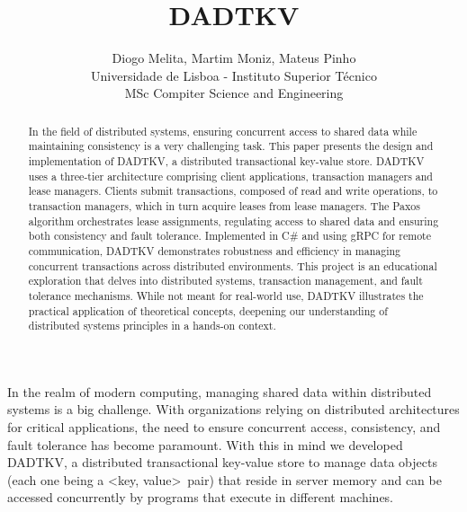 \documentclass[times, 10pt,twocolumn]{article}
\begin{document}
\title{DADTKV}

\author{Diogo Melita, Martim Moniz, Mateus Pinho\\
Universidade de Lisboa - Instituto Superior Técnico\\
MSc Compiter Science and Engineering
}

\maketitle
\thispagestyle{empty}

\begin{abstract}
       In the field of distributed systems, ensuring concurrent access to 
       shared data while maintaining consistency is a very challenging task. This 
       paper presents the design and implementation of DADTKV, a distributed 
       transactional key-value store. DADTKV uses a three-tier architecture 
       comprising client applications, transaction managers and lease managers. 
       Clients submit transactions, composed of read and write operations, to 
       transaction managers, which in turn acquire leases from lease managers. 
       The Paxos algorithm orchestrates lease assignments, regulating access to 
       shared data and ensuring both consistency and fault tolerance. Implemented 
       in C\# and using gRPC for remote communication, DADTKV demonstrates robustness 
       and efficiency in managing concurrent transactions across distributed environments.
       This project is an educational exploration that delves into distributed systems, 
       transaction management, and fault tolerance mechanisms. While not meant for 
       real-world use, DADTKV illustrates the practical application of theoretical 
       concepts, deepening our understanding of distributed systems principles in 
       a hands-on context.
\end{abstract}




In the realm of modern computing, managing shared data within distributed 
systems is a big challenge. With organizations relying on distributed 
architectures for critical applications, the need to ensure concurrent 
access, consistency, and fault tolerance has become paramount. With this in 
mind we developed DADTKV, a distributed transactional key-value store to 
manage data objects (each one being a \textless key, value\textgreater\ pair) 
that reside in server memory and can be accessed concurrently by programs that 
execute in different machines.
\end{document}
